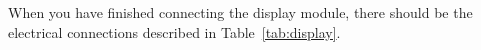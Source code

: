 %

When you have finished connecting the display module, there should be the electrical connections described in Table~\ref{tab:display}.

